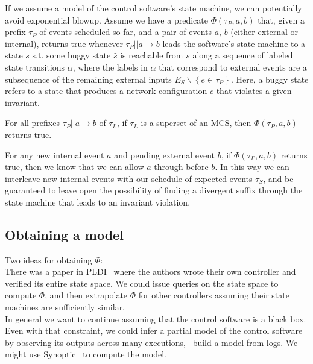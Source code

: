 If we assume a model of the control software's state machine, we can potentially
avoid exponential blowup. Assume we have a predicate $\Phi(\tau_P, a, b)$
that, given a prefix $\tau_P$ of events scheduled so far, and a pair of events $a$, $b$
(either external or internal), returns true whenever $\tau_P || a \rightarrow
b$ leads the software's state machine to a state $s$ s.t. some buggy state
$\hat{s}$ is reachable from $s$ along a sequence of labeled state transitions
$\alpha$, where the labels in $\alpha$
that correspond to external events are a subsequence of the remaining external inputs $E_S
\backslash \left\{ e \in \tau_P \right\}$. 
Here, a buggy state refers to
a state that produces a network configuration $c$ that violates a given
invariant.

For all prefixes $\tau_P || a\rightarrow b$ of $\tau_L$, if $\tau_L$ is a
superset of an MCS, then $\Phi(\tau_P, a, b)$ returns true.

For any new internal event $a$ and pending external event $b$, if
$\Phi(\tau_P, a, b)$ returns true, then we know that we can allow $a$ through
before $b$. In this way we can interleave new
internal events with our schedule of expected events $\tau_S$, and be
guaranteed to leave open the possibility of finding a divergent suffix through the
state machine that leads to an invariant violation.

\subsection{Obtaining a model}

Two ideas for obtaining $\Phi$: \\

 There was a paper in
PLDI~\cite{vericon} where the authors
wrote their own controller and verified its entire state space. We could issue
queries on the state space to compute $\Phi$, and then extrapolate $\Phi$ for
other controllers assuming their state machines are sufficiently similar. \\

 In general we want to
continue assuming that the control software is a black box.
Even with that constraint, we could infer a partial model of the control
software by observing its outputs across many executions, \ie~build a model
from logs. We might use Synoptic~\cite{beschastnikh2011leveraging} to compute
the model.

